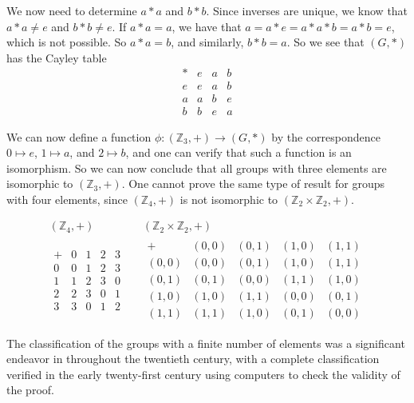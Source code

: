 \documentclass[
]{book}
\theoremstyle{definition}
\theoremstyle{definition}
\theoremstyle{definition}
\theoremstyle{definition}
\theoremstyle{remark}
\begin{document}
We now need to determine \(a*a\) and \(b*b\). Since inverses are unique, we know that \(a*a\neq e\) and \(b*b\neq e\). If \(a*a=a\), we have that \(a = a*e=a*a*b=a*b=e\), which is not possible. So \(a*a=b\), and similarly, \(b*b=a\). So we see that \((G,*)\) has the Cayley table
\[\begin{array}{c|ccc}
    * & e & a & b \\ \hline
    e & e & a & b \\
    a & a & b & e  \\
    b & b & e  & a
\end{array}\]

We can now define a function \(\phi:(\mathbb{Z}_3,+) \rightarrow (G,*)\) by the correspondence \(0\mapsto e\), \(1\mapsto a\), and \(2\mapsto b\),
and one can verify that such a function is an isomorphism. So we can now conclude that all groups with three elements are isomorphic to \((\mathbb{Z}_3,+)\). One cannot prove the same type of result for groups with four elements, since \((\mathbb{Z}_4,+)\) is not isomorphic to \((\mathbb{Z}_2 \times \mathbb{Z}_2, +)\).

\[\begin{array}{ccc}
(\mathbb{Z}_4,+) & &  (\mathbb{Z}_2 \times \mathbb{Z}_2, +) \\
\begin{array}{c|cccc}
    + & 0 & 1 & 2 & 3 \\ \hline
    0 &  0 & 1 & 2 & 3 \\ 
    1 & 1 & 2 & 3 & 0 \\
    2 & 2 & 3 & 0 & 1 \\
    3 & 3 & 0 & 1 & 2 
\end{array}
& &
\begin{array}{c|cccc}
 + & (0,0) & (0,1) & (1,0) & (1,1) \\ \hline
  (0,0) & (0,0) & (0,1) & (1,0) & (1,1) \\ 
  (0,1) & (0,1) & (0,0) & (1,1) & (1,0) \\ 
  (1,0) & (1,0) & (1,1) & (0,0) & (0,1) \\
  (1,1) & (1,1) & (1,0) & (0,1) & (0,0)
\end{array}
\end{array}\]

The classification of the groups with a finite number of elements was a significant endeavor in throughout the twentieth century, with a complete classification verified in the early twenty-first century using computers to check the validity of the proof.
\end{document}
